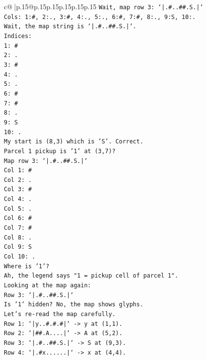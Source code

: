 \documentclass{article}
\begin{document}
{\begin{supertabular}{c@{$\;$}|p{.15\linewidth}@{}p{.15\linewidth}p{.15\linewidth}p{.15\linewidth}p{.15\linewidth}p{.15\linewidth}}
{{{\texttt{Wait, map row 3: `|.\#..\#\#.S.|`} \\
\texttt{Cols: 1:\#, 2:., 3:\#, 4:., 5:., 6:\#, 7:\#, 8:., 9:S, 10:.} \\
\texttt{Wait, the map string is `|.\#..\#\#.S.|`.} \\
\texttt{Indices:} \\
\texttt{1: \#} \\
\texttt{2: .} \\
\texttt{3: \#} \\
\texttt{4: .} \\
\texttt{5: .} \\
\texttt{6: \#} \\
\texttt{7: \#} \\
\texttt{8: .} \\
\texttt{9: S} \\
\texttt{10: .} \\
\texttt{My start is (8,3) which is 'S'. Correct.} \\
\texttt{Parcel 1 pickup is '1' at (3,7)?} \\
\texttt{Map row 3: `|.\#..\#\#.S.|`} \\
\texttt{Col 1: \#} \\
\texttt{Col 2: .} \\
\texttt{Col 3: \#} \\
\texttt{Col 4: .} \\
\texttt{Col 5: .} \\
\texttt{Col 6: \#} \\
\texttt{Col 7: \#} \\
\texttt{Col 8: .} \\
\texttt{Col 9: S} \\
\texttt{Col 10: .} \\
\texttt{Where is '1'?} \\
\texttt{Ah, the legend says "1 = pickup cell of parcel 1".} \\
\texttt{Looking at the map again:} \\
\texttt{Row 3: `|.\#..\#\#.S.|`} \\
\texttt{Is '1' hidden? No, the map shows glyphs.} \\
\texttt{Let's re{-}read the map carefully.} \\
\texttt{Row 1: `|y..\#.\#.\#|` {-}> y at (1,1).} \\
\texttt{Row 2: `|\#\#.A....|` {-}> A at (5,2).} \\
\texttt{Row 3: `|.\#..\#\#.S.|` {-}> S at (9,3).} \\
\texttt{Row 4: `|.\#x......|` {-}> x at (4,4).} \\
}}}
\end{supertabular}}
\end{document}
